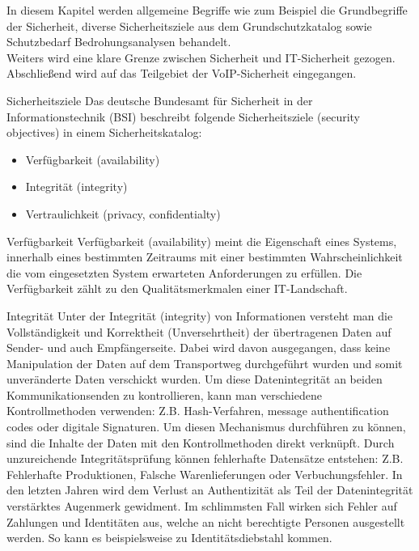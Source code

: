 \label{Grundlagen der IT-Sicherheit}
 In diesem Kapitel werden allgemeine Begriffe wie zum Beispiel die Grundbegriffe der
 Sicherheit, diverse Sicherheitsziele aus dem Grundschutzkatalog sowie Schutzbedarf 
 Bedrohungsanalysen behandelt. 
 \\
 Weiters wird eine klare Grenze zwischen Sicherheit und IT-Sicherheit gezogen. 
 Abschließend wird auf das Teilgebiet der VoIP-Sicherheit eingegangen.
 \\

 \label{Sicherheitsziele}
 \begin{section}{Sicherheitsziele}
  Das deutsche Bundesamt für Sicherheit in der Informationstechnik (BSI) beschreibt 
  folgende Sicherheitsziele (security objectives) in einem Sicherheitskatalog: 
  \cite{BSIBedarf}
  \begin{itemize}
   \item Verfügbarkeit (availability)
   \item Integrität (integrity)
   \item Vertraulichkeit (privacy, confidentialty)
  \end{itemize}
  \pagebreak
  
   \begin{subsection}{Verfügbarkeit}
    Verfügbarkeit (availability) meint die Eigenschaft eines Systems, innerhalb eines 
    bestimmten Zeitraums mit einer bestimmten Wahrscheinlichkeit die vom eingesetzten 
    System erwarteten Anforderungen zu erfüllen. Die Verfügbarkeit zählt zu den 
    Qualitätsmerkmalen einer IT-Landschaft.
    \\
   \end{subsection}

   \label{Integrität}
   \begin{subsection}{Integrität}
    Unter der Integrität (integrity) von Informationen versteht man die Vollständigkeit und 
    Korrektheit (Unversehrtheit) der übertragenen Daten auf Sender- und auch Empfängerseite. 
    Dabei wird davon ausgegangen, dass keine Manipulation der Daten auf dem Transportweg 
    durchgeführt wurden und somit unveränderte Daten verschickt wurden. Um diese 
    Datenintegrität an beiden Kommunikationsenden zu kontrollieren, kann man verschiedene 
    Kontrollmethoden verwenden: \ac{Z.B.} Hash-Verfahren, message authentification codes 
    oder digitale Signaturen. Um diesen Mechanismus durchführen zu können, sind die Inhalte 
    der Daten mit den Kontrollmethoden direkt verknüpft. 
    Durch unzureichende Integritätsprüfung können fehlerhafte Datensätze entstehen: Z.B. 
    Fehlerhafte Produktionen, Falsche Warenlieferungen oder Verbuchungsfehler. 
    In den letzten Jahren wird dem Verlust an Authentizität als Teil der Datenintegrität 
    verstärktes Augenmerk gewidment. 
    Im schlimmsten Fall wirken sich Fehler auf Zahlungen und Identitäten aus, welche an 
    nicht berechtigte Personen ausgestellt werden. So kann es beispielsweise zu 
    Identitätsdiebstahl kommen.
    \cite{BSIInfosi} \cite{BSIa} \cite{BSIBegriffe1}
    \\
   \end{subsection}


\end{section}
